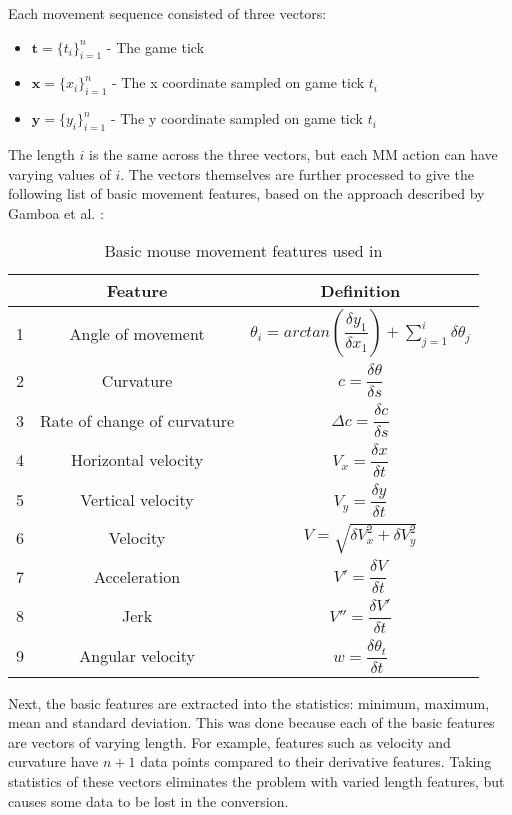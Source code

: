 \documentclass[Report.tex]{subfiles}
\begin{document}
Each movement sequence consisted of three vectors:
\begin{itemize}
\item $\boldsymbol{t} = \{t_i\}^{n}_{i=1}$ - The game tick
\item $\boldsymbol{x} = \{x_i\}^{n}_{i=1}$ - The x coordinate sampled on game tick $t_i$
\item $\boldsymbol{y} = \{y_i\}^{n}_{i=1}$ - The y coordinate sampled on game tick $t_i$
\end{itemize}
The length $i$ is the same across the three vectors, but each MM action can have varying values of $i$. The vectors themselves are further processed to give the following list of basic movement features, based on the approach described by Gamboa et al. \cite{mouse-features}:
\begin{table}[H]
\renewcommand*{\arraystretch}{2.5}
\centering
\begin{tabular}{| c | c | c |}
\hline
& \textbf{Feature} & \textbf{Definition} \\ \hline
1 & Angle of movement & $\theta_i = arctan(\dfrac{\delta y_1}{\delta x_1}) + \sum\limits_{j=1}^{i} \delta \theta_j$ \\ \hline
2 & Curvature & $c = \dfrac{\delta\theta}{\delta s}$ \\ \hline
3 & Rate of change of curvature & $\Delta c = \dfrac{\delta c}{\delta s}$ \\ \hline
4 & Horizontal velocity & $V_x = \dfrac{\delta x}{\delta t}$ \\ \hline
5 & Vertical velocity & $V_y = \dfrac{\delta y}{\delta t}$ \\ \hline
6 & Velocity & $V = \sqrt{\delta V_{x}^{2} + \delta V_{y}^{2}}$ \\ \hline
7 & Acceleration & $V' = \dfrac{\delta V}{\delta t}$ \\ \hline
8 & Jerk & $V'' = \dfrac{\delta V'}{\delta t}$ \\ \hline
9 & Angular velocity & $w = \dfrac{\delta \theta_t}{\delta t}$ \\ \hline
\end{tabular}
\caption{Basic mouse movement features used in \cite{mouse-features}}
\label{tbl:mm-features}
\end{table}

Next, the basic features are extracted into the statistics: minimum, maximum, mean and standard deviation. This was done because each of the basic features are vectors of varying length. For example, features such as velocity and curvature have $n + 1$ data points compared to their derivative features. Taking statistics of these vectors eliminates the problem with varied length features, but causes some data to be lost in the conversion.
\end{document}
